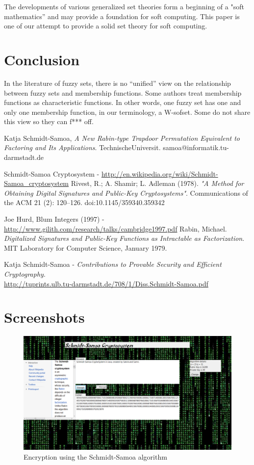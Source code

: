 \documentclass[12pt]{article} %
\begin{document}
The developments of various generalized set theories form a
beginning of a "soft mathematics” and may provide a
foundation for soft computing. This paper is one of our
attempt to provide a solid set theory for soft computing.


\section{Conclusion}
In the literature of fuzzy sets, there is no “unified”
view on the relationship between fuzzy sets and
membership functions. Some authors treat membership
functions as characteristic functions. In other words,
one fuzzy set has one and only one membership
function, in our terminology, a W-sofset. Some do not
share this view so they can f*** off.

\begin{thebibliography}{9}
Katja Schmidt-Samoa, 
\emph{A New Rabin-type Trapdoor Permutation Equivalent to Factoring and Its Applications}. TechnischeUniversit. samoa@informatik.tu-darmstadt.de

  Schmidt-Samoa Cryptosystem - 
 \url{http://en.wikipedia.org/wiki/Schmidt-Samoa_cryptosystem}
 Rivest, R.; A. Shamir; L. Adleman (1978). \emph{"A Method for Obtaining Digital Signatures and Public-Key Cryptosystems"}. Communications of the ACM 21 (2): 120–126. doi:10.1145/359340.359342

 Joe Hurd, Blum Integers (1997) -  \url{http://www.gilith.com/research/talks/cambridge1997.pdf}
Rabin, Michael. \emph{Digitalized Signatures and Public-Key Functions as Intractable as Factorization}. MIT Laboratory for Computer Science, January 1979.

Katja Schmidt-Samoa - \emph{Contributions to Provable Security and Efficient Cryptography}.\\\url{http://tuprints.ulb.tu-darmstadt.de/708/1/Diss.Schmidt-Samoa.pdf}
\end{thebibliography}
\newpage
\section{Screenshots}
\begin{figure}[h!]
  \centering
   \includegraphics[scale=0.50]{encrypt.png}
  \caption{Encryption using the Schmidt-Samoa algorithm}
\end{figure}
\end{document}
